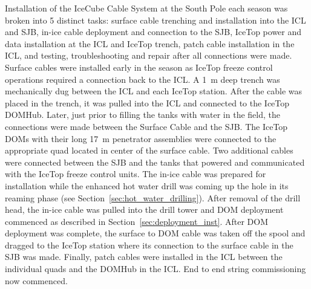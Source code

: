 Installation of the IceCube Cable System at the South Pole each season was
broken into 5 distinct tasks: surface cable trenching and
installation into the ICL and SJB, in-ice cable deployment and
connection to the SJB, IceTop power and data installation at the ICL and
IceTop trench, patch cable installation in the ICL, and testing,
troubleshooting and repair after all connections were made. Surface cables
were installed early in the season as IceTop freeze control operations
required a connection back to the ICL. A 1~m deep trench was mechanically
dug between the ICL and each IceTop station. After the cable was placed in
the trench, it was pulled into the ICL and connected to the IceTop
DOMHub. Later, just prior to filling the tanks with water in the field, the
connections were made between the Surface Cable and the SJB. The IceTop
DOMs with their long 17~m penetrator assemblies were connected to the
appropriate quad located in center of the surface cable. Two additional
cables were connected between the SJB and the tanks that powered and
communicated with the IceTop freeze control units. The in-ice cable
was prepared for installation while the enhanced hot water drill was coming
up the hole in its reaming phase (see Section~\ref{sec:hot_water_drilling}). After removal of the drill head, the
in-ice cable was pulled into the drill tower and DOM deployment
commenced as described in Section~\ref{sec:deployment_inst}. After DOM deployment was complete, the
surface to DOM cable was taken off the spool and dragged to the IceTop
station where its connection to the surface cable in the SJB was
made. Finally, patch cables were installed in the ICL between the
individual quads and the DOMHub in the ICL. End to end string commissioning
now commenced.
